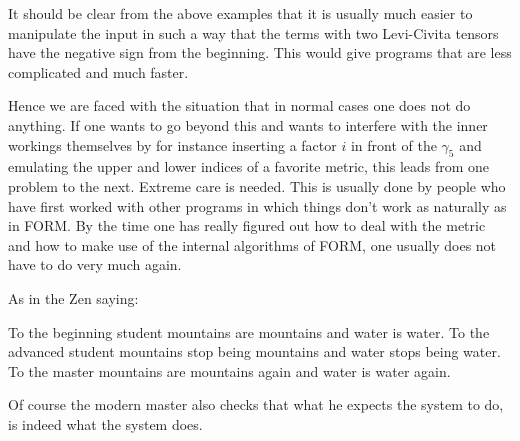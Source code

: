 \noindent It should be clear from the above examples that it is usually 
much easier to manipulate the input in such a way that the terms with two 
Levi-Civita tensors have the negative sign from the beginning. This would 
give programs that are less complicated and much faster. \hfill \vspace{2mm}

\noindent Hence we are faced with the situation that in normal cases one 
does not do anything. If one wants to go beyond this and wants to interfere 
with the inner workings themselves by for instance inserting a factor $i$ 
in front of the $\gamma_5$ and emulating the upper and lower indices of a 
favorite metric, this leads from one problem to the next. Extreme care is 
needed. This is usually done by people who have first worked with other 
programs in which things don't work as naturally as in FORM. By the time 
one has really figured out how to deal with the metric and how to make use 
of the internal algorithms of FORM, one usually does not have to do very 
much again. \hfill \vspace{2mm}

\noindent As in the Zen saying: \hfill \vspace{2mm}

\noindent To the beginning student mountains are mountains 
and water is water. To the advanced student 
mountains stop being mountains and water stops being water. To the 
master mountains are mountains again and water is water 
again. \hfill \vspace{2mm}

\noindent Of course the modern master also checks that what he expects the 
system to do, is indeed what the system does.
